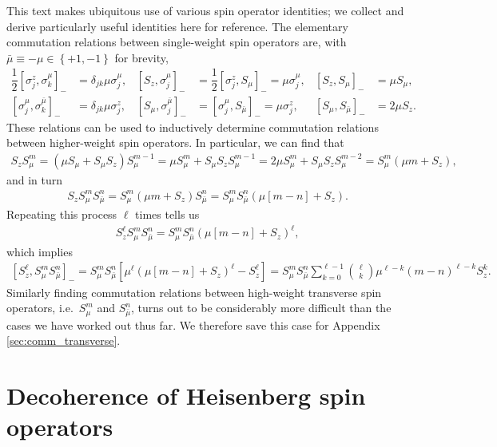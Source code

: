 \documentclass[aps,notitlepage,nofootinbib,11pt]{revtex4-1}
\newcommand{\f}[2]{\dfrac{#1}{#2}} %
\newcommand{\p}[1]{\left(#1\right)} %
\renewcommand{\sp}[1]{\left[#1\right]} %
\renewcommand{\set}[1]{\left\{#1\right\}} %
\newcommand{\bmu}{{\bar\mu}}
\newcommand{\1}{\mathds{1}}
\begin{document}
This text makes ubiquitous use of various spin operator identities; we
collect and derive particularly useful identities here for reference.
The elementary commutation relations between single-weight spin
operators are, with $\bmu\equiv-\mu\in\set{+1,-1}$ for brevity,
\begin{align}
  \f12 \sp{\sigma_j^z,\sigma_k^\mu}_-
  &= \delta_{jk} \mu \sigma_j^\mu,
  &
  \sp{S_z,\sigma_j^\mu}_-
  &= \f12 \sp{\sigma_j^z,S_\mu}_- = \mu \sigma_j^\mu,
  &
  \sp{S_z,S_\mu}_-
  &= \mu S_\mu,
  \label{eq:comm_z_mu_base} \\
  \sp{\sigma_j^\mu,\sigma_k^\bmu}_-
  &= \delta_{jk} \mu \sigma_j^z,
  &
  \sp{S_\mu,\sigma_j^\bmu}_-
  &= \sp{\sigma_j^\mu,S_\bmu}_- = \mu \sigma_j^z,
  &
  \sp{S_\mu,S_\bmu}_-
  &= 2 \mu S_z.
  \label{eq:comm_mu_base}
\end{align}
These relations can be used to inductively determine commutation
relations between higher-weight spin operators.  In particular, we can
find that
\begin{align}
  S_z S_\mu^m
  = \p{\mu S_\mu + S_\mu S_z} S_\mu^{m-1}
  = \mu S_\mu^m + S_\mu S_z S_\mu^{m-1}
  = 2 \mu S_\mu^m + S_\mu S_z S_\mu^{m-2}
  = S_\mu^m \p{\mu m + S_z},
  \label{eq:push_z_mu_single}
\end{align}
and in turn
\begin{align}
  S_z S_\mu^m S_\bmu^n
  = S_\mu^m \p{\mu m + S_z} S_\bmu^n
  = S_\mu^m S_\bmu^n \p{\mu\sp{m - n} + S_z}.
\end{align}
Repeating this process $\ell$ times tells us
\begin{align}
  S_z^\ell S_\mu^m S_\bmu^n
  = S_\mu^m S_\bmu^n \p{\mu\sp{m - n} + S_z}^\ell,
  \label{eq:push_z_mu}
\end{align}
which implies
\begin{align}
  \sp{S_z^\ell, S_\mu^m S_\bmu^n}_-
  = S_\mu^m S_\bmu^n \sp{\mu^\ell \p{\mu\sp{m - n} + S_z}^\ell - S_z^\ell}
  = S_\mu^m S_\bmu^n  \sum_{k=0}^{\ell-1} {\ell \choose k}
  \mu^{\ell-k} \p{m-n}^{\ell-k} S_z^k.
  \label{eq:comm_z_mu}
\end{align}
Similarly finding commutation relations between high-weight transverse
spin operators, i.e.~$S_\mu^m$ and $S_\bmu^n$, turns out to be
considerably more difficult than the cases we have worked out thus
far.  We therefore save this case for Appendix
\ref{sec:comm_transverse}.


\section{Decoherence of Heisenberg spin operators}
\label{sec:decoherence}
\end{document}

